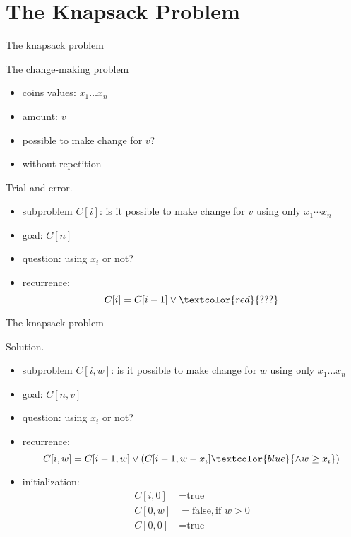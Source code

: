 \section{The Knapsack Problem}

\begin{frame}{The knapsack problem}
  \begin{exampleblock}{The change-making problem }
    \begin{itemize}
      \item coins values: $x_{1} \dots x_{n}$
      \item amount: $v$
      \item possible to make change for $v$?
      \item without repetition
    \end{itemize}
  \end{exampleblock}

  \pause
  \begin{alertblock}{Trial and error.}
    \begin{itemize}
      \item subproblem $C[i]$: is it possible to make change for $v$ using only $x_{1} \cdots x_{n}$
      \item goal: $C[n]$
      \item question: using $x_{i}$ or not?
      \item recurrence:
	\[
	  C[i] = C[i-1] \lor \textcolor{red}{???}
	\]
    \end{itemize}
  \end{alertblock}
\end{frame}
\begin{frame}{The knapsack problem}
  \begin{block}{Solution.}
    \begin{itemize}
      \item subproblem $C[i, w]$: is it possible to make change for $w$ using only $x_{1} \dots x_{n}$
      \item goal: $C[n,v]$
      \item question: using $x_{i}$ or not?
      \item recurrence:
	\[
	  C[i,w] = C[i-1, w] \lor (C[i-1, w-x_{i}] \textcolor{blue}{\land w \ge x_{i}})
	\]
      \item<2-> initialization:
	\begin{align*}
	  C[i,0] &= \text{true}  \\
	  C[0,w] &= \text{false}, \text{if } w > 0 \\
	  C[0,0] &= \text{true}
	\end{align*}
    \end{itemize}
  \end{block}
\end{frame}
